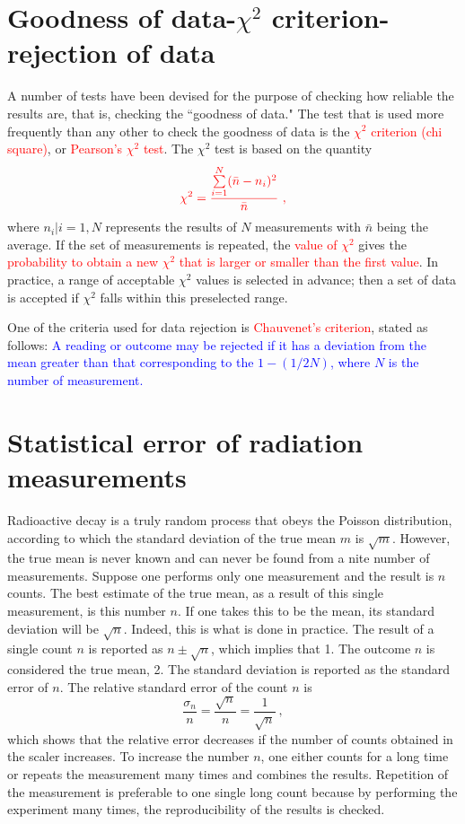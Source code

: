 \documentclass[12pt,a4paper]{article}
\begin{document}
\section{Goodness of data-$\chi^2$ criterion-rejection of data}
A number of tests have been devised for the purpose of checking how reliable the results are, that is, checking the ``goodness of data."  The test that is used more frequently than any other to check the goodness of data is the \textcolor{red}{$\chi^2$ criterion (chi square)}, or \textcolor{red}{Pearson's $\chi^2$ test}. The $\chi^2$ test is based on the quantity
\begin{equation}
\color{red} \chi^2 = \dfrac{\sum\limits_{i=1}^N (\bar{n} -n_i)^2}{\bar{n}} ~,
\end{equation}
where $n_i|i = 1, N$ represents the results of $N$ measurements with $\bar{n}$ being the average. If the set of measurements is repeated, the \textcolor{red}{value of $\chi^2$} gives the \textcolor{red}{probability to obtain a new $\chi^2$ that is larger or smaller than the first value}.  In practice, a range of acceptable $\chi^2$ values is selected in advance; then a set of data is accepted if $\chi^2$ falls within this preselected range.


One of the criteria used for data rejection is \textcolor{red}{Chauvenet's criterion}, stated as follows: \textcolor{blue}{A reading or outcome may be rejected if it has a deviation from the mean greater than that corresponding to the $1 - (1/2N)$, where $N$ is the number of measurement.}

\section{Statistical error of radiation measurements}
Radioactive decay is a truly random process that obeys the Poisson distribution, according to which the standard deviation of the true mean $m$ is $\sqrt{m}$. However, the true mean is never known and can never be found from a  nite number of measurements. Suppose one performs only one measurement and the result is $n$ counts. The best estimate of the true mean, as a result of this single measurement, is this number $n$. If one takes this to be the mean, its standard deviation will be $\sqrt{n}$. Indeed, this is what is done in practice. The result of a single count $n$ is reported as $n \pm \sqrt{n}$, which implies that 1. The outcome $n$ is considered the true mean, 2. The standard deviation is reported as the standard error of $n$. The relative standard error of the count $n$ is
\begin{equation}
\dfrac{\sigma_n}{n} = \dfrac{\sqrt{n} }{n} = \dfrac{1}{\sqrt{n} } ~,
\end{equation}
which shows that the relative error decreases if the number of counts obtained in the scaler increases. To increase the number $n$, one either counts for a long time or repeats the measurement many times and combines the results. Repetition of the measurement is preferable to one single long count because by performing the experiment many times, the reproducibility of the results is checked.
\end{document}
